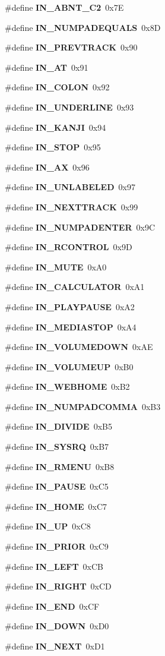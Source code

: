 \begin{CompactItemize}
\#define {\bf IN\_\-ABNT\_\-C2}~0x7E
\item 
\#define {\bf IN\_\-NUMPADEQUALS}~0x8D
\item 
\#define {\bf IN\_\-PREVTRACK}~0x90
\item 
\#define {\bf IN\_\-AT}~0x91
\item 
\#define {\bf IN\_\-COLON}~0x92
\item 
\#define {\bf IN\_\-UNDERLINE}~0x93
\item 
\#define {\bf IN\_\-KANJI}~0x94
\item 
\#define {\bf IN\_\-STOP}~0x95
\item 
\#define {\bf IN\_\-AX}~0x96
\item 
\#define {\bf IN\_\-UNLABELED}~0x97
\item 
\#define {\bf IN\_\-NEXTTRACK}~0x99
\item 
\#define {\bf IN\_\-NUMPADENTER}~0x9C
\item 
\#define {\bf IN\_\-RCONTROL}~0x9D
\item 
\#define {\bf IN\_\-MUTE}~0xA0
\item 
\#define {\bf IN\_\-CALCULATOR}~0xA1
\item 
\#define {\bf IN\_\-PLAYPAUSE}~0xA2
\item 
\#define {\bf IN\_\-MEDIASTOP}~0xA4
\item 
\#define {\bf IN\_\-VOLUMEDOWN}~0xAE
\item 
\#define {\bf IN\_\-VOLUMEUP}~0xB0
\item 
\#define {\bf IN\_\-WEBHOME}~0xB2
\item 
\#define {\bf IN\_\-NUMPADCOMMA}~0xB3
\item 
\#define {\bf IN\_\-DIVIDE}~0xB5
\item 
\#define {\bf IN\_\-SYSRQ}~0xB7
\item 
\#define {\bf IN\_\-RMENU}~0xB8
\item 
\#define {\bf IN\_\-PAUSE}~0xC5
\item 
\#define {\bf IN\_\-HOME}~0xC7
\item 
\#define {\bf IN\_\-UP}~0xC8
\item 
\#define {\bf IN\_\-PRIOR}~0xC9
\item 
\#define {\bf IN\_\-LEFT}~0xCB
\item 
\#define {\bf IN\_\-RIGHT}~0xCD
\item 
\#define {\bf IN\_\-END}~0xCF
\item 
\#define {\bf IN\_\-DOWN}~0xD0
\item 
\#define {\bf IN\_\-NEXT}~0xD1

\end{CompactItemize}
